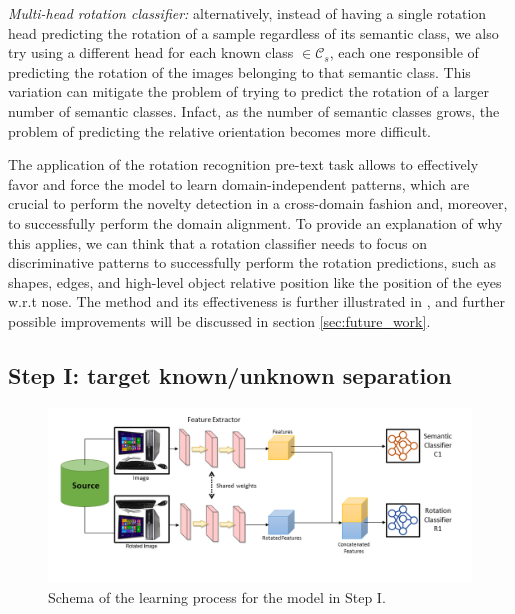 \documentclass[10pt,twocolumn,letterpaper]{article}
\begin{document}
{\it Multi-head rotation classifier:}
alternatively, 
instead of having a single rotation head predicting the rotation of a sample regardless of its semantic class, 
we also try using a different head for each known class $\in \mathcal{C}_s$, each one responsible of predicting the rotation
of the images belonging to that semantic class.
This variation can mitigate the problem of trying to predict the rotation of a larger number
of semantic classes. Infact, as the number of semantic classes grows,
the problem of predicting the relative orientation becomes more difficult.

The application of the rotation recognition pre-text task allows to effectively favor and force the model to learn
domain-independent patterns, which are crucial to perform the novelty detection in a cross-domain fashion and, moreover,
to successfully perform the domain alignment.
To provide an explanation of why this applies, we can think that a rotation classifier needs to focus on discriminative patterns to
successfully perform the rotation predictions, such as shapes, edges, and high-level object relative position like the position of the eyes
w.r.t nose.
The method and its effectiveness is further illustrated in \cite{OldROS},
and further possible improvements will be discussed in section \ref{sec:future_work}.

\subsection{Step I: target known/unknown separation}
\label{sec:stepone}

\begin{figure}
  \includegraphics[trim= 0cm 0cm 0cm 0cm, clip, width=\linewidth]{scheme_step1.png}
  \caption{\label{fig:step1} Schema of the learning process for the model in Step I.}
\end{figure}
\end{document}

